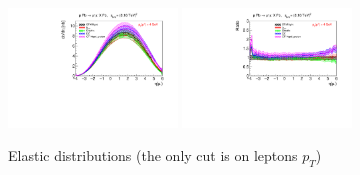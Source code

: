 \begin{figure}[h!]
\includegraphics[width=0.4\textwidth]{figures/etal_elastic.pdf}
\includegraphics[width=0.4\textwidth]{figures/Ratioetal_elastic.pdf}
\caption{Elastic distributions (the only cut is on leptons $p_T$)}
\label{fig:elastic}
\end{figure}

